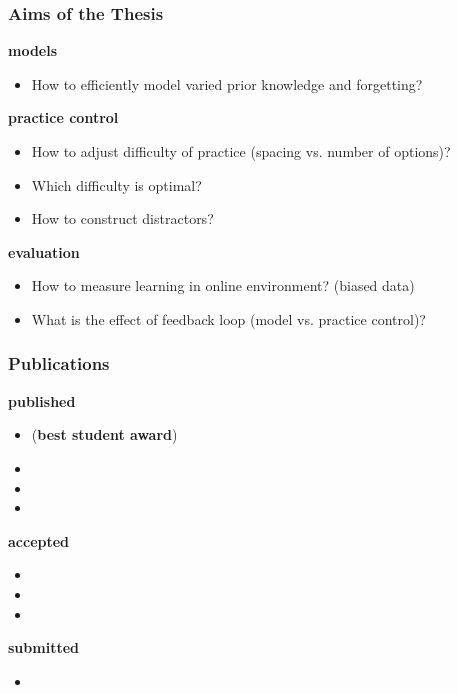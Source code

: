 \documentclass[xcolor=svgnames]{beamer}
\begin{document}
\begin{frame}
	\frametitle{Aims of the Thesis}
		\small
		\textbf{models}
		\begin{itemize}
			\item How to efficiently model varied prior knowledge and forgetting?
		\end{itemize}
		\textbf{practice control}
		\begin{itemize}
			\item How to adjust difficulty of practice (spacing vs. number of options)?
			\item Which difficulty is optimal?
			\item How to construct distractors?
		\end{itemize}
		\textbf{evaluation}
		\begin{itemize}
			\item How to measure learning in online environment? (biased data)
			\item What is the effect of feedback loop (model vs. practice control)?
		\end{itemize}
\end{frame}
\begin{frame}
	\frametitle{Publications}
	\tiny
	{\small \textbf{published}}
	\begin{itemize}
		\item {} (\textbf{best student award})
		\item {}
		\item {}
		\item {}
	\end{itemize}
	{\small \textbf{accepted}}
	\begin{itemize}
		\item {}
		\item {}
		\item {}
	\end{itemize}
	{\small \textbf{submitted}}
	\begin{itemize}
		\item {}
	\end{itemize}
\end{frame}
\end{document}

